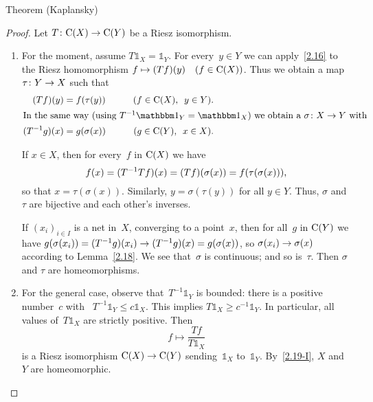 \documentclass[main.tex]{subfiles}
\begin{document}
%
%
\begin{psec}{2.19}{Theorem (Kaplansky)}
\end{psec}
\begin{proof}
Let $T\colon \mathrm{C}(X)\rightarrow \mathrm{C}(Y)$ be a Riesz isomorphism.
\begin{enumerate}[label=(\Roman*)]
\item \label{2.19-I}
For the moment, assume 
$T\mathbb{1}_X = \mathbb{1}_Y$.
For every~$y\in Y$ 
we can apply~\ref{2.16} to the Riesz homomorphism
$f\mapsto (Tf)(y)\quad (f\in\mathrm{C}(X))$.
Thus we obtain a map $\tau\colon Y\rightarrow X$ such that
\begin{alignat*}{2}
(Tf)(y) &= f(\tau(y)) 
\qquad &(f\in\Cont{X}\htam{, }\ y\in Y)
\htam{.}\\
\intertext{%
In the same way (using $T^{-1} \mathbb{1}_Y = \mathbb{1}_X$)
we obtain a $\sigma\colon X\ra Y$ with}
(T^{-1}g)(x) &= g(\sigma(x)) 
 &(g\in \Cont{Y}\htam{, }\ x\in X)
\htam{.}
\end{alignat*}

If $x\in X$, then for every~$f$ in $\mathrm{C}(X)$ we have
\begin{equation*}
f(x) = (T^{-1} T f)(x) = (Tf)(\sigma(x)) = f(\tau(\sigma (x)))\text{,}
\end{equation*}
so that $x=\tau(\sigma(x))$.
Similarly, $y=\sigma(\tau(y))$ for all $y\in Y$.
Thus, $\sigma$ and~$\tau$ are bijective and each other's inverses.

If $(x_i)_{i \in I}$ is a net in~$X$,
converging to a point~$x$,
then for all~$g$ in $\mathrm{C}(Y)$
we have $g(\sigma(x_i))=(T^{-1} g)(x_i)\rightarrow (T^{-1}g)(x)=g(\sigma(x))$,
so $\sigma(x_i)\rightarrow \sigma(x)$ according to Lemma~\ref{2.18}.
We see that~$\sigma$ is continuous;
and so is~$\tau$.
Then $\sigma$ and $\tau$ are homeomorphisms.
%
\item \label{2.19-II}
For the general case,
observe that~$T^{-1}\mathbb{1}_Y$ is bounded:
there is a positive number~$c$ 
with ~$T^{-1}\mathbb{1}_Y \leq c \mathbb{1}_X$.
This implies $T\mathbb{1}_X \ge c^{-1} \mathbb{1}_Y$.
In particular,
all values of~$T\mathbb{1}_X$ are strictly positive.
Then
\begin{equation*}
f \mapsto \frac{Tf}{T\mathbb{1}_X}
\end{equation*}
is a Riesz isomorphism $\mathrm{C}(X)\rightarrow\mathrm{C}(Y)$
sending~$\mathbb{1}_X$ to~$\mathbb{1}_Y$.
By~\ref{2.19-I}, 
$X$ and~$Y$ are homeomorphic. \xqed
\end{enumerate}
\end{proof}
\end{document}
